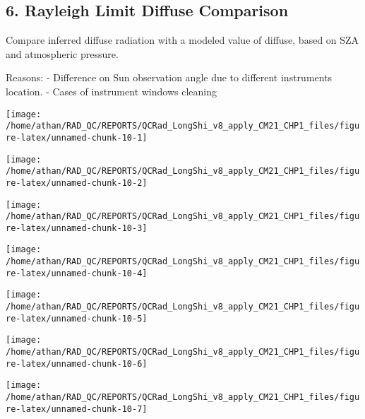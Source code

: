 \documentclass[
  10pt,
  a4paper,oneside]{article}
\begin{document}
\newpage

\hypertarget{rayleigh-limit-diffuse-comparison}{%
\subsection{6. Rayleigh Limit Diffuse Comparison}\label{rayleigh-limit-diffuse-comparison}}

Compare inferred diffuse radiation with a modeled value of diffuse,
based on SZA and atmospheric pressure.

Reasons:
- Difference on Sun observation angle due to different instruments location.
- Cases of instrument windows cleaning

\begin{center}\texttt{[image: /home/athan/RAD\_QC/REPORTS/QCRad\_LongShi\_v8\_apply\_CM21\_CHP1\_files/figure-latex/unnamed-chunk-10-1]} \end{center}

\begin{center}\texttt{[image: /home/athan/RAD\_QC/REPORTS/QCRad\_LongShi\_v8\_apply\_CM21\_CHP1\_files/figure-latex/unnamed-chunk-10-2]} \end{center}

\begin{center}\texttt{[image: /home/athan/RAD\_QC/REPORTS/QCRad\_LongShi\_v8\_apply\_CM21\_CHP1\_files/figure-latex/unnamed-chunk-10-3]} \end{center}

\begin{center}\texttt{[image: /home/athan/RAD\_QC/REPORTS/QCRad\_LongShi\_v8\_apply\_CM21\_CHP1\_files/figure-latex/unnamed-chunk-10-4]} \end{center}

\begin{center}\texttt{[image: /home/athan/RAD\_QC/REPORTS/QCRad\_LongShi\_v8\_apply\_CM21\_CHP1\_files/figure-latex/unnamed-chunk-10-5]} \end{center}

\begin{center}\texttt{[image: /home/athan/RAD\_QC/REPORTS/QCRad\_LongShi\_v8\_apply\_CM21\_CHP1\_files/figure-latex/unnamed-chunk-10-6]} \end{center}

\begin{center}\texttt{[image: /home/athan/RAD\_QC/REPORTS/QCRad\_LongShi\_v8\_apply\_CM21\_CHP1\_files/figure-latex/unnamed-chunk-10-7]} \end{center}
\end{document}
